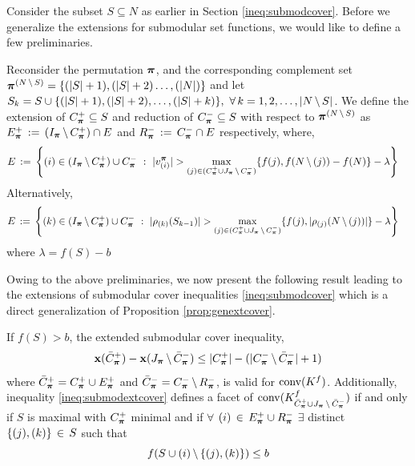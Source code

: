 \documentclass[10pt,twoside]{amsart}
\begin{document}
Consider the subset $S \subseteq N$ as earlier in Section \ref{ineq:submodcover}. Before we generalize the extensions for submodular set functions, we would like to define a few preliminaries.
\begin{dfn}
  Reconsider the permutation $\boldsymbol\pi$, and the corresponding complement set $\boldsymbol\pi^{(N\,\backslash\, S)} = \{(|S|+1),(|S|+2)\ldots,(|N|)\}$ and let $S_k = S \cup \{(|S|+1), (|S|+2), \ldots, (|S|+k)\},\,\,\forall\,k = 1,2,\ldots,|N\,\backslash\, S|$. We define the extension of $C^+_{\boldsymbol\pi} \subseteq S$ and reduction of $C^-_{\boldsymbol\pi} \subseteq S$ with respect to $\boldsymbol\pi^{(N\,\backslash\, S)}$ as $E_{\boldsymbol\pi}^+ \,:=\, (I_{\boldsymbol\pi}\,\backslash\, C^+_{\boldsymbol\pi}) \cap E$ and $R_{\boldsymbol\pi}^- \,:=\, C^-_{\boldsymbol\pi} \cap E$ respectively, where,
  \begin{align*}
    & E \,:=\, \left\{ {(i) \in (I_{\boldsymbol\pi}\,\backslash\, C^+_{\boldsymbol\pi}) \cup C^-_{\boldsymbol\pi}} \ : \ {|v^{\boldsymbol\pi}_{(i)}| > \underset{(j) \in (C^+_{\boldsymbol\pi} \cup J_{\boldsymbol\pi}\,\backslash\, C^-_{\boldsymbol\pi})}{\max}\{f(j),f(N\,\backslash\, (j)) - f(N)\} - \lambda} \right\}
  \end{align*}
  Alternatively,
  \begin{align*}
    & E \,:=\, \left\{ {(k) \in (I_{\boldsymbol\pi}\,\backslash\, C^+_{\boldsymbol\pi}) \cup C^-_{\boldsymbol\pi}} \ : \ {|\rho_{(k)}(S_{k-1})| > \underset{(j) \in (C^+_{\boldsymbol\pi} \cup J_{\boldsymbol\pi}\,\backslash\, C^-_{\boldsymbol\pi})}{\max}\{f(j),|\rho_{(j)}(N\,\backslash\, (j))|\} - \lambda} \right\}
  \end{align*}
  where $\lambda = f(S) - b$
\end{dfn}

Owing to the above preliminaries, we now present the following result leading to the extensions of submodular cover inequalities \eqref{ineq:submodcover} which is a direct generalization of Proposition \ref{prop:genextcover}.

\begin{prop}
  If $f(S) > b$, the extended submodular cover inequality,
  \begin{align}
  \label{ineq:submodextcover}
    \mathbf{x}(\bar{C}^+_{\boldsymbol\pi}) - \mathbf{x}(J_{\boldsymbol\pi}\,\backslash\,\bar{C}^-_{\boldsymbol\pi}) \leq |C^+_{\boldsymbol\pi}| - (|{C}^-_{\boldsymbol\pi}\,\backslash\, \bar{C}^-_{\boldsymbol\pi}| + 1)
  \end{align}
  where $\bar{C}^+_{\boldsymbol\pi} = C^+_{\boldsymbol\pi} \cup E_{\boldsymbol\pi}^+$ and $\bar{C}^-_{\boldsymbol\pi} = C^-_{\boldsymbol\pi} \,\backslash\, R_{\boldsymbol\pi}^-$, is valid for $\operatorname{conv}(K^f)$. Additionally, inequality \eqref{ineq:submodextcover} defines a facet of $\operatorname{conv}(K^f_{\bar{C}^+_{\boldsymbol\pi}\cup J_{\boldsymbol\pi}\,\backslash\,\bar{C}^-_{\boldsymbol\pi}})$ if and only if $S$ is maximal with $C^+_{\boldsymbol\pi}$ minimal and if $\forall$ $(i) \,\in\, E_{\boldsymbol\pi}^+ \cup R_{\boldsymbol\pi}^-$ $\exists$ distinct $\{(j),(k)\} \,\in\, S$ such that $$f(S\cup (i)\,\backslash\, \{(j),(k)\})\leq b$$
\end{prop}
\end{document}
